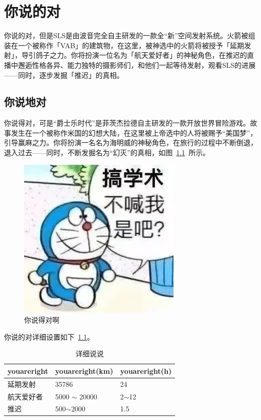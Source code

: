 \chapter{你说的对}
你说的对，但是SLS是由波音完全自主研发的一款全“新”空间发射系统。火箭被组装在一个被称作「VAB」的建筑物，在这里，被神选中的火箭将被授予「延期发射」，导引鸽子之力。你将扮演一位名为「航天爱好者」的神秘角色，在推迟的直播中邂逅性格各异、能力独特的摄影师们，和他们一起等待发射，观看SLS的进展——同时，逐步发掘「推迟」的真相。

\section{你说地对}
你说得对，可是“爵士乐时代”是菲茨杰拉德自主研发的一款开放世界冒险游戏。故事发生在一个被称作米国的幻想大陆，在这里被上帝选中的人将被赐予“美国梦”，引导赢麻之力。你将扮演一名名为海明威的神秘角色，在旅行的过程中不断倒退，退入过去——同时，不断发掘名为“幻灭”的真相，如图~\ref{class}~所示。

\begin{figure}[htbp!]
	\centering
	\includegraphics[width=0.7\textwidth]{figures/demo.jpg}
	\caption{你说得对啊\protect \cite{youareright}}\label{class}
\end{figure}

你说的对详细设置如下~\ref{classdetail}。
\begin{table}[!ht]
	\centering
	
	\begin{tabular}{lll}
		\hline
		\textbf{youareright} & \textbf{youareright(km)} & \textbf{youareright(h)} \\ \hline
		延期发射 & 35786 & 24 \\ 
		航天爱好者 & 5000 $\sim$ 20000 & 2$\sim$12 \\ 
		推迟 & 500$\sim$2000 & 1.5 \\ \hline
	\end{tabular}
	\caption{详细说说}
	\label{classdetail}
\end{table}



